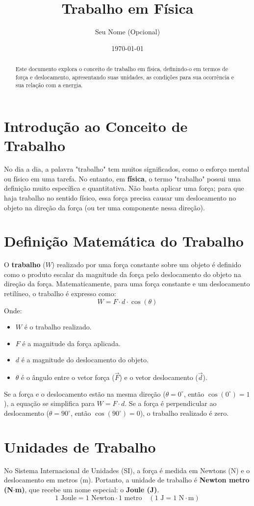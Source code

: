 \documentclass{article}
\title{Trabalho em Física}
\author{Seu Nome (Opcional)}
\date{\today}
\begin{document}
\maketitle

\begin{abstract}
Este documento explora o conceito de trabalho em física, definindo-o em termos de força e deslocamento, apresentando suas unidades, as condições para sua ocorrência e sua relação com a energia.
\end{abstract}

\section{Introdução ao Conceito de Trabalho}
No dia a dia, a palavra "trabalho" tem muitos significados, como o esforço mental ou físico em uma tarefa. No entanto, em \textbf{física}, o termo "trabalho" possui uma definição muito específica e quantitativa. Não basta aplicar uma força; para que haja trabalho no sentido físico, essa força precisa causar um deslocamento no objeto na direção da força (ou ter uma componente nessa direção).

\section{Definição Matemática do Trabalho}
O \textbf{trabalho} ($W$) realizado por uma força constante sobre um objeto é definido como o produto escalar da magnitude da força pelo deslocamento do objeto na direção da força. Matematicamente, para uma força constante e um deslocamento retilíneo, o trabalho é expresso como:
$$ W = F \cdot d \cdot \cos(\theta) $$
Onde:
\begin{itemize}
    \item $W$ é o trabalho realizado.
    \item $F$ é a magnitude da força aplicada.
    \item $d$ é a magnitude do deslocamento do objeto.
    \item $\theta$ é o ângulo entre o vetor força ($\vec{F}$) e o vetor deslocamento ($\vec{d}$).
\end{itemize}
Se a força e o deslocamento estão na mesma direção ($\theta = 0^\circ$, então $\cos(0^\circ) = 1$), a equação se simplifica para $W = F \cdot d$. Se a força é perpendicular ao deslocamento ($\theta = 90^\circ$, então $\cos(90^\circ) = 0$), o trabalho realizado é zero.

\section{Unidades de Trabalho}
No Sistema Internacional de Unidades (SI), a força é medida em Newtons (N) e o deslocamento em metros (m). Portanto, a unidade de trabalho é \textbf{Newton metro (N$\cdot$m)}, que recebe um nome especial: o \textbf{Joule (J)}.
$$ 1 \text{ Joule} = 1 \text{ Newton} \cdot 1 \text{ metro} \quad (1\text{ J} = 1\text{ N}\cdot\text{m}) $$
\end{document}

